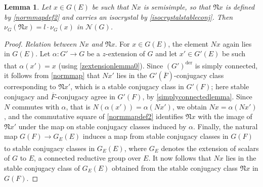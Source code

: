 \documentclass[11pt,a4paper]{article}
\theoremstyle{definition}
\theoremstyle{plain}
\newtheorem{Le}[shared]{Lemma}
\theoremstyle{remark}
\theoremstyle{plain}
\begin{document}
\begin{Le}\label{normisolem2}
    Let $x \in G(E)$ be such that $Nx$ is semisimple, so that $\mathfrak{N}x$ is defined by \ref{normmapdef2} and carries an isocrystal by \ref{isocrystalstableconj}. Then $\nu_{G}(\mathfrak{N}x) = l \cdot \nu_G(x)$ in $\mathcal{N}(G)$.
\end{Le}
\begin{proof}
    \textit{Relation between $Nx$ and $\mathfrak{N}x$}. For $x \in G(E)$, the element $Nx$ again lies in $G(E)$. Let $\alpha: G' \xrightarrow[]{} G$ be a $z$-extension of $G$ and let $x' \in G'(E)$ be such that $\alpha(x') = x$ (using \ref{zextensionlemma0}). Since $(G')^{\text{der}}$ is simply connected, it follows from \ref{normmap} that $Nx'$ lies in the $G'(\overline{F})$-conjugacy class corresponding to $\mathfrak{N}x'$, which is a stable conjugacy class in $G'(F)$; here stable conjugacy and $\overline{F}$-conjugacy agree in $G'(F)$, by \ref{simplyconnectedlemma}. Since $N$ commutes with $\alpha$, that is $N(\alpha(x')) = \alpha(Nx')$, we obtain $Nx = \alpha(Nx')$, and the commutative square of \ref{normmapdef2} identifies $\mathfrak{N}x$ with the image of $\mathfrak{N}x'$ under the map on stable conjugacy classes induced by $\alpha$. Finally, the natural map $G(F) \xrightarrow[]{} G_E(E)$ induces a map from stable conjugacy classes in $G(F)$ to stable conjugacy classes in $G_E(E)$, where $G_E$ denotes the extension of scalars of $G$ to $E$, a connected reductive group over $E$. It now follows that $Nx$ lies in the stable conjugacy class of $G_E(E)$ obtained from the stable conjugacy class $\mathfrak{N}x$ in $G(F)$.


\end{proof}
\end{document}
